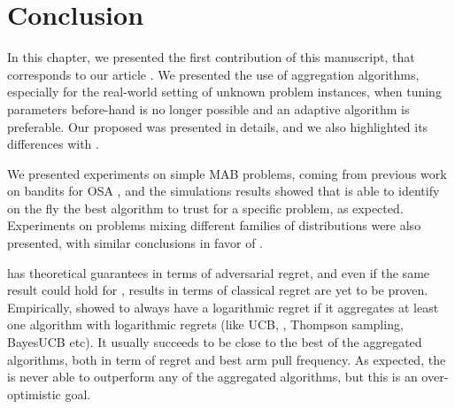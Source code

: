 



\newpage  %

\section{Conclusion}
\label{sec:25:conclusion}

In this chapter, we presented the first contribution of this manuscript,
that corresponds to our article \cite{Besson2018WCNC}.
%
We presented the use of aggregation algorithms,
especially for the real-world setting of unknown problem instances,
when tuning parameters before-hand is no longer possible and an adaptive algorithm is preferable.
Our proposed \Aggr{} was presented in details,
and we also highlighted its differences with \ExpQ.

%
We presented experiments on simple MAB problems, coming from previous work on bandits for OSA \cite{Jouini10},
and the simulations results showed that \Aggr{} is able to identify on the fly the best algorithm to trust for a specific problem, as expected.
Experiments on problems mixing different families of distributions were also presented, with similar conclusions in favor of \Aggr.

\ExpQ{} has theoretical guarantees in terms of adversarial regret, and even if the same result could hold for \Aggr, results in terms of classical regret are yet to be proven.
Empirically, \Aggr{} showed to always have a logarithmic
regret if it aggregates at least one algorithm with logarithmic regrets (like UCB, \klUCB, Thompson sampling, BayesUCB etc).
It usually succeeds to be close to the best of the aggregated algorithms, both in term of regret and best arm pull frequency.
As expected, the \Aggr{} is never able to outperform any of the aggregated algorithms, but this is an over-optimistic goal.

